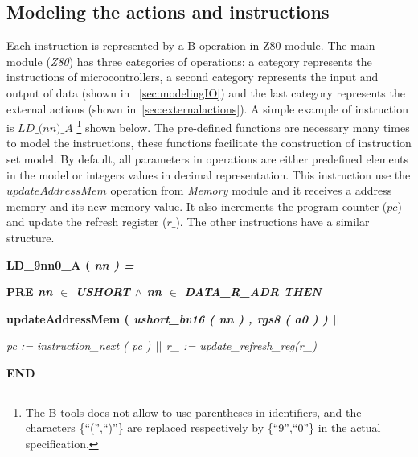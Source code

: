 \documentclass[a4paper]{llncs}
\newcommand{\footnoteremember}[2]{
  \footnote{#2}
  \newcounter{#1}
  \setcounter{#1}{\value{footnote}}
}
\begin{document}
\subsection{Modeling the actions and instructions}

Each instruction is represented by a B operation in Z80 module. The main
module (\textit{Z80}) has three categories of operations: a category represents the 
instructions of microcontrollers, a second category represents the input and output of data 
(shown in ~\ref{sec:modelingIO}) and the last category represents the external
actions (shown in~\ref{sec:externalactions}). A simple example of instruction is
$\textit{LD\_(nn)\_A}$\footnoteremember{myfootnote}{The B tools does not allow
to use parentheses in identifiers, and the characters \{``('',``)''\} are
replaced respectively by \{``9'',``0''\} in the actual specification.} shown below. The
pre-defined functions are necessary many times to model the instructions, these
functions facilitate the construction of instruction set model. By default, all
parameters in operations are either predefined elements in the model or
integers values in decimal representation. This instruction use the
$\textit{updateAddressMem}$ operation from \textit{Memory} module and it receives
a address memory and its new memory value. It also increments the program
counter ($\textit{pc}$) and update the refresh register ($\textit{r\_}$).
The other instructions have a similar structure.

\hspace*{0.00in}\bf LD\_9nn0\_A \rm ( \it nn \rm ) \rm =

\hspace*{0.20in}\bf PRE \it nn $\in$ \it USHORT\hspace*{0.15in} $\land$ \hspace*{0.10in}\it nn\hspace*{0.10in} $\in$  \it DATA\_R\_ADR \hspace*{0.10in}\bf THEN

\hspace*{0.20in}\bf updateAddressMem \rm ( \it ushort\_bv16 \rm ( \it nn \rm ) \rm , \it rgs8 \rm ( \it a0 \rm )
\rm )  $\mbox{$\mid\mid$}$

\hspace*{0.20in}\it pc \rm := \it instruction\_next \rm ( \it pc \rm )  $\mbox{$\mid\mid$}$  \it r\_ \rm := \it update\_refresh\_reg\rm (\it r\_\rm )

\hspace*{0.00in}\bf END\rm 
\end{document}
